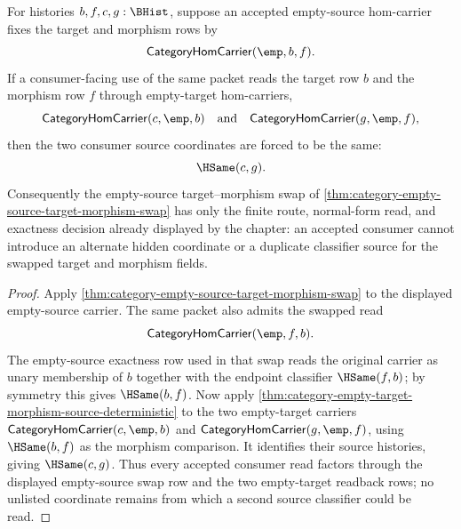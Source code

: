 \begin{corollary}
\label{cor:category-empty-source-target-morphism-swap-consumer-determinacy}
For histories $b,f,c,g:\BHist$, suppose an accepted empty-source hom-carrier
fixes the target and morphism rows by
$$
\mathsf{CategoryHomCarrier}(\emp,b,f).
$$
If a consumer-facing use of the same packet reads the target row $b$ and the
morphism row $f$ through empty-target hom-carriers,
$$
\mathsf{CategoryHomCarrier}(c,\emp,b)
\quad\text{and}\quad
\mathsf{CategoryHomCarrier}(g,\emp,f),
$$
then the two consumer source coordinates are forced to be the same:
$$
\HSame(c,g).
$$
Consequently the empty-source target--morphism swap of
\autoref{thm:category-empty-source-target-morphism-swap} has only the finite
route, normal-form read, and exactness decision already displayed by the
chapter: an accepted consumer cannot introduce an alternate hidden coordinate
or a duplicate classifier source for the swapped target and morphism fields.
\end{corollary}
\begin{proof}
Apply \autoref{thm:category-empty-source-target-morphism-swap} to the displayed
empty-source carrier. The same packet also admits the swapped read
$$
\mathsf{CategoryHomCarrier}(\emp,f,b).
$$
The empty-source exactness row used in that swap reads the original carrier as
unary membership of $b$ together with the endpoint classifier $\HSame(f,b)$;
by symmetry this gives $\HSame(b,f)$.
Now apply \autoref{thm:category-empty-target-morphism-source-deterministic} to
the two empty-target carriers
$\mathsf{CategoryHomCarrier}(c,\emp,b)$ and
$\mathsf{CategoryHomCarrier}(g,\emp,f)$, using $\HSame(b,f)$ as the morphism
comparison. It identifies their source histories, giving $\HSame(c,g)$.
Thus every accepted consumer read factors through the displayed empty-source
swap row and the two empty-target readback rows; no unlisted coordinate remains
from which a second source classifier could be read.
\end{proof}
